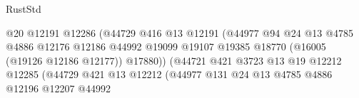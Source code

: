 \begin{lexlean}{RustStd}
\begin{coremodule}
                                                    @20
                                                    @12191
                                                    @12286
                                                    (@44729
                                                      @416
                                                      @13
                                                      @12191
                                                      (@44977
                                                        @94
                                                        @24
                                                        @13
                                                        @4785
                                                        @4886
                                                        @12176
                                                        @12186
                                                        @44992
                                                        @19099
                                                        @19107
                                                        @19385
                                                        @18770
                                                        (@16005 (@19126 @12186 @12177))
                                                        @17880))
                                                    (@44721
                                                      @421
                                                      @3723
                                                      @13
                                                      @19
                                                      @12212
                                                      @12285
                                                      (@44729
                                                        @421
                                                        @13
                                                        @12212
                                                        (@44977
                                                          @131
                                                          @24
                                                          @13
                                                          @4785
                                                          @4886
                                                          @12196
                                                          @12207
                                                          @44992

\end{coremodule}
\end{lexlean}
